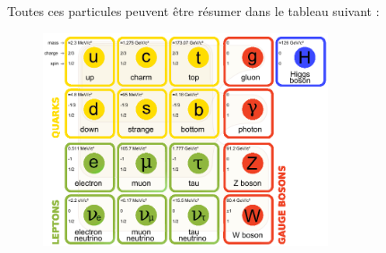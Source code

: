 Toutes ces particules peuvent être résumer dans le tableau suivant : 
\begin{figure}[h!]
\centering
\includegraphics[width=0.75\textwidth]{SM/bestiaire2.png}
\label{bestiaire}
\end{figure}
\marginpar
